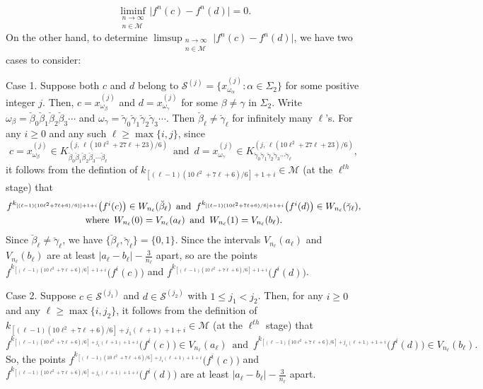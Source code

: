 \documentclass[12pt]{article}
\newcommand{\al}{\alpha}
\newcommand{\be}{\beta}
\begin{document}
$$
\liminf_{\substack{n \to \infty \\ n \in \mathcal M}} \big|f^n(c) - f^n(d)\big| = 0.
$$
\indent On the other hand, to determine $\limsup_{\substack{n \to \infty \\ n \in \mathcal M}} \big|f^n(c) - f^n(d)\big|$, we have two cases to consider:

Case 1. Suppose both $c$ and $d$ belong to $\mathcal S^{(j)} = \{ x_{\omega_\al}^{(j)}: \al \in \Sigma_2 \}$ for some positive integer $j$. Then, $c = x_{\omega_{\be}}^{(j)}$ and $d = x_{\omega_{\gamma}}^{(j)}$ for some $\be \ne \gamma$ in $\Sigma_2$.  Write $\omega_{\be} = \breve \be_0 \breve \be_1 \breve \be_2 \breve \be_3 \cdots$ and $\omega_{\gamma} = \breve \gamma_0 \breve \gamma_1 \breve \gamma_2 \breve \gamma_3 \cdots$.  Then $\breve \be_\ell \ne \breve \gamma_\ell$ for infinitely many $\ell$'s.  For any $i \ge 0$ and any such $\ell \ge \max \{ i,j \}$, since 
$$
c = x_{\omega_{\be}}^{(j)} \in K_{\breve \be_0 \breve \be_1 \breve \be_2 \breve \be_3 \cdots\breve \be_\ell}^{(j, \, \ell(10\ell^2+27\ell+23)/6)} \,\,\, \text{and} \,\,\, d = x_{\omega_{\gamma}}^{(j)} \in K_{\breve \gamma_0 \breve \gamma_1 \breve \gamma_2 \breve \gamma_3 \cdots\breve \gamma_\ell}^{(j, \, \ell(10\ell^2+27\ell+23)/6)},
$$
it follows from the defintion of $k_{[(\ell-1)(10\ell^2+7\ell+6)/6]+1+i} \in \mathcal M$ (at the $\ell^{th}$ stage) that 
\begin{multline*}
$$
f^{k_{[(\ell-1)(10\ell^2+7\ell+6)/6)]+1+i}}\big(f^i(c)\big) \in W_{n_\ell}(\breve \be_\ell) \,\,\, \text{and} \,\,\, f^{k_{[(\ell-1)(10\ell^2+7\ell+6)/6]+1+i}}\big(f^i(d)\big) \in W_{n_\ell}(\breve \gamma_\ell), \\ \text{where} \,\,\, W_{n_\ell}(0) = V_{n_\ell}(a_\ell) \,\,\, \text{and} \,\,\,  W_{n_\ell}(1) = V_{n_\ell}(b_\ell).
$$
\end{multline*}
Since $\breve \be_\ell \ne \breve \gamma_\ell$, we have $\{ \breve \be_\ell, \breve \gamma_\ell \} = \{ 0, 1 \}$.  Since the intervals $V_{n_\ell}(a_\ell)$ and $V_{n_\ell}(b_\ell)$ are at least $|a_\ell - b_\ell| - \frac 3{n_\ell}$ apart, so are the points $f^{k_{[(\ell-1)(10\ell^2+7\ell+6)/6]+1+i}}\big(f^i(c)\big)$ and $f^{k_{[(\ell-1)(10\ell^2+7\ell+6)/6]+1+i}}\big(f^i(d)\big)$.  

Case 2. Suppose $c \in \mathcal S^{(j_1)}$ and $d \in \mathcal S^{(j_2)}$ with $1 \le j_1 < j_2$.  Then, for any $i \ge 0$ and any $\ell \ge \max \{ i, j_2 \}$, it follows from the definition of $k_{[(\ell-1)(10\ell^2+7\ell+6)/6]+j_1(\ell+1)+1+i} \in \mathcal M$ (at the $\ell^{th}$ stage) that 
$$
f^{k_{[(\ell-1)(10\ell^2+7\ell+6)/6]+j_1(\ell+1)+1+i}}\big(f^i(c)\big) \in V_{n_\ell}(a_\ell) \,\,\, \text{and} \,\,\, f^{k_{[(\ell-1)(10\ell^2+7\ell+6)/6]+j_1(\ell+1)+1+i}}\big(f^i(d)\big) \in V_{n_\ell}(b_\ell).
$$
So, the points $f^{k_{[(\ell-1)(10\ell^2+7\ell+6)/6]+j_1(\ell+1)+1+i}}\big(f^i(c)\big)$ and $f^{k_{[(\ell-1)(10\ell^2+7\ell+6)/6]+j_1(\ell+1)+1+i}}\big(f^i(d)\big)$ are at least $|a_\ell - b_\ell| - \frac 3{n_\ell}$ apart.  
\end{document}
